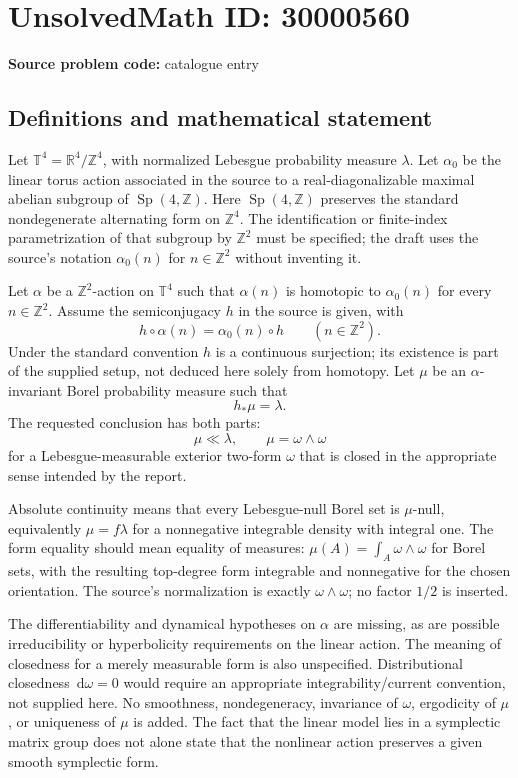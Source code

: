 \documentclass[11pt]{article}
\newcommand{\Z}{\mathbb{Z}}
\newcommand{\R}{\mathbb{R}}
\newcommand{\dd}{\,\mathrm{d}}
\begin{document}
\section*{UnsolvedMath ID: 30000560}
\textbf{Source problem code:} catalogue entry
\subsection{Definitions and mathematical statement}
Let $\mathbb T^4=\R^4/\Z^4$, with normalized Lebesgue probability measure $\lambda$. Let $\alpha_0$ be the linear torus action associated in the source to a real-diagonalizable maximal abelian subgroup of $\operatorname{Sp}(4,\Z)$. Here $\operatorname{Sp}(4,\Z)$ preserves the standard nondegenerate alternating form on $\Z^4$. The identification or finite-index parametrization of that subgroup by $\Z^2$ must be specified; the draft uses the source's notation $\alpha_0(n)$ for $n\in\Z^2$ without inventing it.

Let $\alpha$ be a $\Z^2$-action on $\mathbb T^4$ such that $\alpha(n)$ is homotopic to $\alpha_0(n)$ for every $n\in\Z^2$. Assume the semiconjugacy $h$ in the source is given, with
\[
 h\circ\alpha(n)=\alpha_0(n)\circ h\qquad(n\in\Z^2).
\]
Under the standard convention $h$ is a continuous surjection; its existence is part of the supplied setup, not deduced here solely from homotopy. Let $\mu$ be an $\alpha$-invariant Borel probability measure such that
\[
 h_*\mu=\lambda.
\]
The requested conclusion has both parts:
\[
 \mu\ll\lambda,
 \qquad
 \mu=\omega\wedge\omega
\]
for a Lebesgue-measurable exterior two-form $\omega$ that is closed in the appropriate sense intended by the report.

Absolute continuity means that every Lebesgue-null Borel set is $\mu$-null, equivalently $\mu=f\lambda$ for a nonnegative integrable density with integral one. The form equality should mean equality of measures: $\mu(A)=\int_A\omega\wedge\omega$ for Borel sets, with the resulting top-degree form integrable and nonnegative for the chosen orientation. The source's normalization is exactly $\omega\wedge\omega$; no factor $1/2$ is inserted.

The differentiability and dynamical hypotheses on $\alpha$ are missing, as are possible irreducibility or hyperbolicity requirements on the linear action. The meaning of closedness for a merely measurable form is also unspecified. Distributional closedness $\dd\omega=0$ would require an appropriate integrability/current convention, not supplied here. No smoothness, nondegeneracy, invariance of $\omega$, ergodicity of $\mu$, or uniqueness of $\mu$ is added. The fact that the linear model lies in a symplectic matrix group does not alone state that the nonlinear action preserves a given smooth symplectic form.
\end{document}

